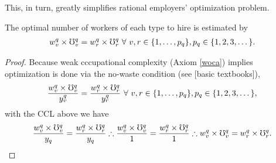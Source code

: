 \documentclass[hidelinks, nonatbib]{elsarticle}
\begin{document}
This, in turn, greatly simplifies rational employers' optimization problem.
\begin{lemma}
    \label{wiol}
    The optimal number of workers of each type to hire is estimated by
    \begin{gather}
        w_{v}^{q}
        \times
        \mho_{v}^{q}
        =
        w_{r}^{q}
        \times
        \mho_{r}^{q}
        \
        \forall
        \
        v,r \in \{1, \dots, p_q\}
        ,
        p_q \in \{1, 2, 3, \dots\}
        .
    \end{gather}

    \begin{proof}
        Because weak cccupational complexity (Axiom \ref{woca}) implies optimization is done via the no-waste condition (see [basic textbooks]),
        \begin{gather}
            \frac{
                w_{v}^{q}
                \times
                \mho_{v}^{q}
            }{
                y_{v}^{q}
            }
            =
            \frac{
                w_{r}^{q}
                \times
                \mho_{r}^{q}
            }{
                y_{r}^{q}
            }
            \
            \forall
            \
            v,r \in \{1, \dots, p_q\}
            ,
            p_q \in \{1, 2, 3, \dots\}
            ,
        \end{gather} 
        with the CCL above we have
        \begin{gather}
            \frac{
                w_{v}^{q}
                \times
                \mho_{v}^{q}
            }{
                y_q
            }
            =
            \frac{
                w_{r}^{q}
                \times
                \mho_{r}^{q}
            }{
                y_q
            }
            \therefore
            \frac{
                w_{v}^{q}
                \times
                \mho_{v}^{q}
            }{
                1
            }
            =
            \frac{
                w_{r}^{q}
                \times
                \mho_{r}^{q}
            }{
                1
            }
            \therefore
            w_{v}^{q}
            \times
            \mho_{v}^{q}
            =
            w_{r}^{q}
            \times
            \mho_{r}^{q}
            .
        \end{gather}
    \end{proof}
\end{lemma}
\end{document}
